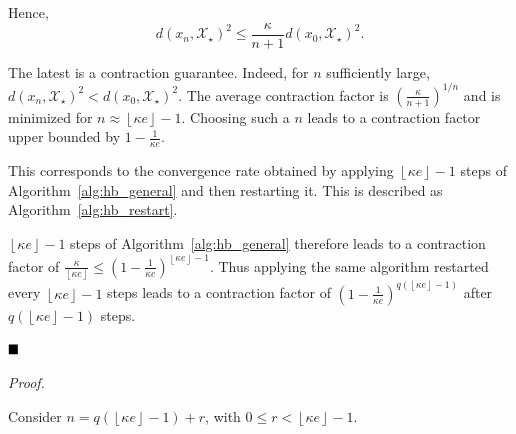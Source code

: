         Hence,
        \begin{equation*}
            d(x_n, \mathcal{X}_\star)^2 \leq \frac{\kappa}{n+1}d(x_0, \mathcal{X}_\star)^2.
        \end{equation*}

        The latest is a contraction guarantee.
        Indeed, for $n$ sufficiently large, $d(x_n, \mathcal{X}_\star)^2 < d(x_0, \mathcal{X}_\star)^2$.
        The average contraction factor is $\left(\frac{\kappa}{n+1}\right)^{1/n}$ and is minimized for $n \approx \left\lfloor \kappa e \right\rfloor - 1$.
        Choosing such a $n$ leads to a contraction factor upper bounded by $1 - \frac{1}{\kappa e}$.

        This corresponds to the convergence rate obtained by applying $\left\lfloor \kappa e \right\rfloor - 1$ steps of Algorithm~\ref{alg:hb_general} and then restarting it.
        This is described as Algorithm~\ref{alg:hb_restart}.

        $\left\lfloor \kappa e \right\rfloor - 1$ steps of Algorithm~\ref{alg:hb_general} therefore leads to a contraction factor of $\frac{\kappa}{\left\lfloor \kappa e\right\rfloor} \leq \left(1 - \frac{1}{\kappa e}\right)^{\left\lfloor \kappa e \right\rfloor - 1}$.
        Thus applying the same algorithm restarted every $\left\lfloor \kappa e \right\rfloor - 1$ steps leads to a contraction factor of $\left(1 - \frac{1}{\kappa e}\right)^{q \left(\left\lfloor \kappa e \right\rfloor - 1\right)}$ after $q \left(\left\lfloor \kappa e \right\rfloor - 1\right)$ steps.

    $\hfill\blacksquare$

    \begin{center}
    \end{center}

    \noindent \textit{Proof.}

        Consider $n = q \left(\left\lfloor \kappa e \right\rfloor - 1\right) + r$, with $0 \leq r < \left\lfloor \kappa e \right\rfloor - 1$.

